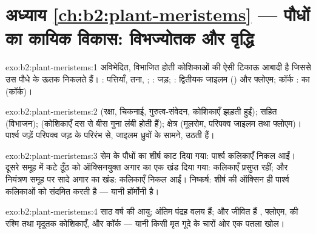 \section*{अध्याय \ref{ch:b2:plant-meristems} --- पौधों का कायिक विकास: विभज्योतक और वृद्धि}

\begin{solution}{exo:b2:plant-meristems:1}
 अविभेदित, विभाजित होती कोशिकाओं की ऐसी टिकाऊ आबादी है
जिससे उस पौधे के ऊतक निकलते हैं। :
पत्तियाँ, तना, ; : जड़; : द्वितीयक जाइलम () और फ्लोएम; कॉर्क :
 का  (कॉर्क)।
\end{solution}

\begin{solution}{exo:b2:plant-meristems:2}
 (रक्षा, चिकनाई, गुरुत्व-संवेदन, कोशिकाएँ झड़ती हुईं);
 सहित  (विभाजन); 
(कोशिकाएँ दस से बीस गुना लंबी होती हैं);  क्षेत्र (मूलरोम,
परिपक्व जाइलम तथा फ्लोएम)। पार्श्व जड़ें परिपक्व जड़ के
परिरंभ से, जाइलम ध्रुवों के सामने, उठती हैं।
\end{solution}

\begin{solution}{exo:b2:plant-meristems:3}
सेम के पौधों का शीर्ष काट दिया गया: पार्श्व कलिकाएँ निकल आईं। दूसरे
समूह में कटे ठूँठ को ऑक्सिनयुक्त अगार का एक खंड दिया गया:
कलिकाएँ प्रसुप्त रहीं; और नियंत्रण समूह पर सादे अगार का खंड: कलिकाएँ
निकल आईं। निष्कर्ष: शीर्ष की ऑक्सिन ही पार्श्व कलिकाओं को संदमित करती
है --- यानी  हॉर्मोनी है।
\end{solution}

\begin{solution}{exo:b2:plant-meristems:4}
साठ वर्ष की आयु;  अंतिम पंद्रह वलय हैं; और जीवित हैं
, फ्लोएम,  की रश्मि तथा मृदूतक कोशिकाएँ,
और कॉर्क  --- यानी किसी मृत गूदे के चारों ओर एक पतला खोल।
\end{solution}

